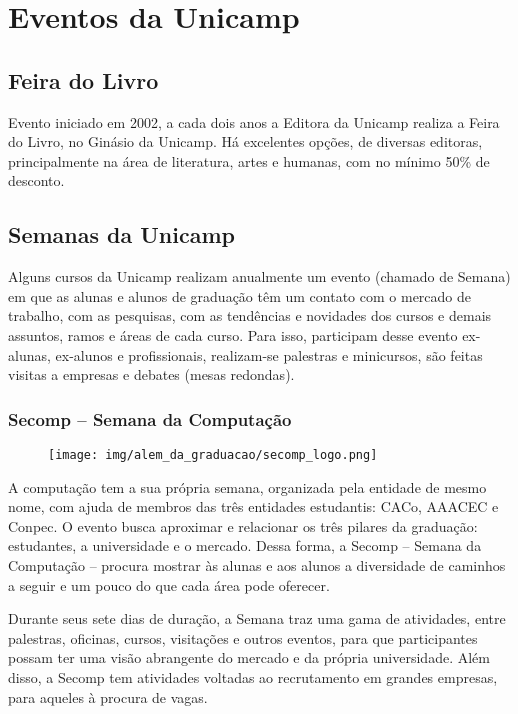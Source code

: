 
\section{Eventos da Unicamp}
\subsection{Feira do Livro}

Evento iniciado em 2002, a cada dois anos a Editora da Unicamp realiza a Feira
do Livro, no Ginásio da Unicamp. Há excelentes opções, de diversas editoras,
principalmente na área de literatura, artes e humanas, com no mínimo 50\% de
desconto.

\subsection{Semanas da Unicamp}

Alguns cursos da Unicamp realizam anualmen\-te um evento (chamado de Semana) em
que as alunas e alunos de graduação têm um contato com o mercado de trabalho,
com as pesquisas, com as tendências e novidades dos cursos e demais assuntos,
ramos e áreas de cada curso. Para isso, participam desse evento ex-alunas,
ex-alunos e profissionais, realizam-se palestras e minicursos, são feitas
visitas a empresas e debates (mesas redondas).

\subsubsection{Secomp -- Semana da Computação}

\begin{figure}[H]
  \centering
  \texttt{[image: img/alem\_da\_graduacao/secomp\_logo.png]}
\end{figure}

A computação tem a sua própria semana, organizada pela entidade de mesmo nome,
com ajuda de membros das três entidades estudantis: CACo, AAACEC e Conpec. O
evento busca aproximar e relacionar os três pilares da graduação: estudantes, a
universidade e o mercado. Dessa forma, a Secomp -- Semana da Computação --
procura mostrar às alunas e aos alunos a diversidade de caminhos a seguir e um
pouco do que cada área pode oferecer.

Durante seus sete dias de duração, a Semana traz uma gama de atividades, entre
palestras, oficinas, cursos, visitações e outros eventos, para que
participantes possam ter uma visão abrangente do mercado e da própria
universidade. Além disso, a Secomp tem atividades voltadas ao recrutamento em
grandes empresas, para aqueles à procura de vagas.

